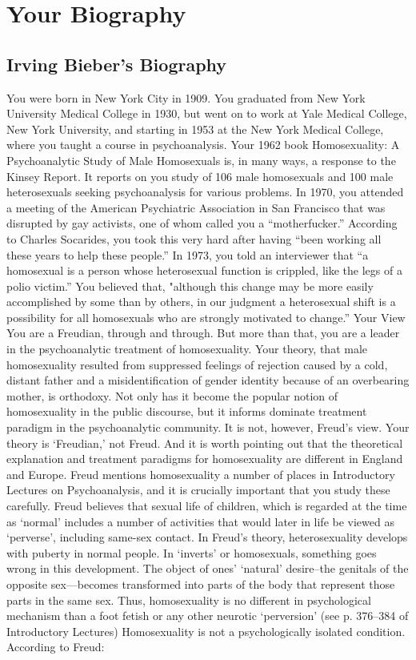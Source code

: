 \section{Your Biography}
\label{yourbiography}

\subsection{Irving Bieber's Biography}
\label{irvingbiebersbiography}

You were born in New York City in 1909. You graduated from New York University Medical College in 1930, but went on to work at Yale Medical College, New York University, and starting in 1953 at the New York Medical College, where you taught a course in psychoanalysis. Your 1962 book Homosexuality: A Psychoanalytic Study of Male Homosexuals is, in many ways, a response to the Kinsey Report. It reports on you study of 106 male homosexuals and 100 male heterosexuals seeking psychoanalysis for various problems.
In 1970, you attended a meeting of the American Psychiatric Association in San Francisco that was disrupted by gay activists, one of whom called you a ``motherfucker.'' According to Charles Socarides, you took this very hard after having ``been working all these years to help these people.'' In 1973, you told an interviewer that ``a homosexual is a person whose heterosexual function is crippled, like the legs of a polio victim.'' You believed that, "although this change may be more easily accomplished by some than by others, in our judgment a heterosexual shift is a possibility for all homosexuals who are strongly motivated to change.”
Your View
You are a Freudian, through and through. But more than that, you are a leader in the psychoanalytic treatment of homosexuality. Your theory, that male homosexuality resulted from suppressed feelings of rejection caused by a cold, distant father and a misidentification of gender identity because of an overbearing mother, is orthodoxy. Not only has it become the popular notion of homosexuality in the public discourse, but it informs dominate treatment paradigm in the psychoanalytic community.
It is not, however, Freud's view. Your theory is `Freudian,' not Freud. And it is worth pointing out that the theoretical explanation and treatment paradigms for homosexuality are different in England and Europe.
Freud mentions homosexuality a number of places in Introductory Lectures on Psychoanalysis, and it is crucially important that you study these carefully. Freud believes that sexual life of children, which is regarded at the time as `normal' includes a number of activities that would later in life be viewed as `perverse', including same-sex contact. In Freud's theory, heterosexuality develops with puberty in normal people. In `inverts' or homosexuals, something goes wrong in this development. The object of ones' `natural' desire--the genitals of the opposite sex—becomes transformed into parts of the body that represent those parts in the same sex. Thus, homosexuality is no different in psychological mechanism than a foot fetish or any other neurotic `perversion' (see p. 376--384 of Introductory Lectures) Homosexuality is not a psychologically isolated condition. According to Freud:
